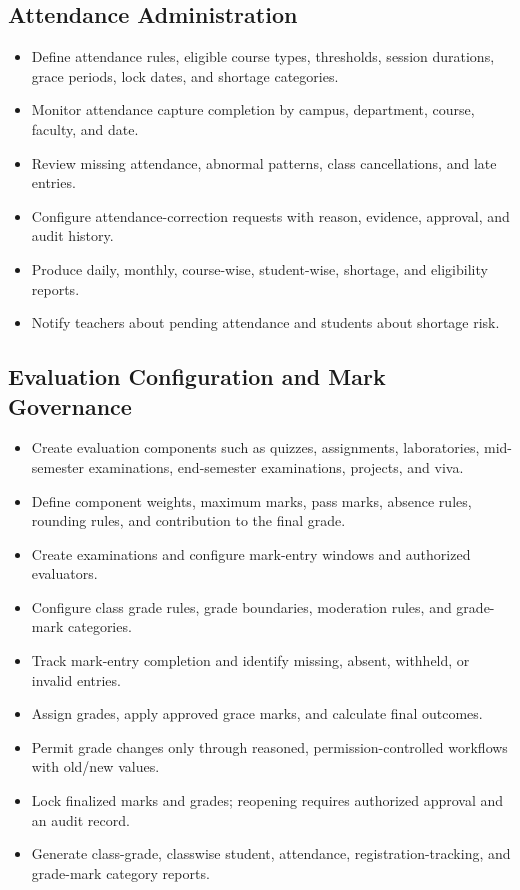 \documentclass[10pt,a4paper]{article}
\begin{document}
\subsection{Attendance Administration}
\begin{itemize}
  \item Define attendance rules, eligible course types, thresholds, session durations,
        grace periods, lock dates, and shortage categories.
  \item Monitor attendance capture completion by campus, department, course, faculty, and date.
  \item Review missing attendance, abnormal patterns, class cancellations, and late entries.
  \item Configure attendance-correction requests with reason, evidence, approval, and audit history.
  \item Produce daily, monthly, course-wise, student-wise, shortage, and eligibility reports.
  \item Notify teachers about pending attendance and students about shortage risk.
\end{itemize}

\subsection{Evaluation Configuration and Mark Governance}
\begin{itemize}
  \item Create evaluation components such as quizzes, assignments, laboratories,
        mid-semester examinations, end-semester examinations, projects, and viva.
  \item Define component weights, maximum marks, pass marks, absence rules,
        rounding rules, and contribution to the final grade.
  \item Create examinations and configure mark-entry windows and authorized evaluators.
  \item Configure class grade rules, grade boundaries, moderation rules, and grade-mark categories.
  \item Track mark-entry completion and identify missing, absent, withheld, or invalid entries.
  \item Assign grades, apply approved grace marks, and calculate final outcomes.
  \item Permit grade changes only through reasoned, permission-controlled workflows with old/new values.
  \item Lock finalized marks and grades; reopening requires authorized approval and an audit record.
  \item Generate class-grade, classwise student, attendance, registration-tracking,
        and grade-mark category reports.
\end{itemize}
\end{document}
